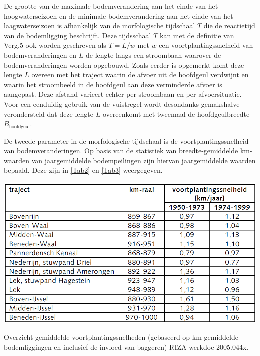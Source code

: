 De grootte van de maximale bodemverandering aan het einde van het hoogwaterseizoen en de minimale bodemverandering aan het einde van het
laagwaterseizoen is afhankelijk van de morfologische tijdschaal $T$  die de reactietijd van de bodemligging beschrijft.
Deze tijdsschaal $T$ kan met de definitie van Verg.5 ook worden geschreven als $T=L/w$ met $w$ een voortplantingssnelheid van bodemveranderingen en $L$ de lengte langs een stroombaan waarover de bodemveranderingen worden opgebouwd.
Zoals eerder is opgemerkt komt deze lengte $L$ overeen met het traject waarin de afvoer uit de hoofdgeul verdwijnt en waarin het
stroombeeld in de hoofdgeul aan deze verminderde afvoer is aangepast.
Deze afstand varieert echter per stroombaan en per afvoersituatie.
Voor een eenduidig gebruik van de vuistregel wordt desondanks gemakshalve verondersteld dat deze lengte $L$ overeenkomt met tweemaal de hoofdgeulbreedte $B_\text{hoofdgeul}$.

De tweede parameter in de morfologische tijdschaal is de voortplantingssnelheid van bodemveranderingen.
Op basis van de statistiek van breedte-gemiddelde km-waarden van jaargemiddelde bodempeilingen \citep{RIZA2005} zijn hiervan jaargemiddelde waarden bepaald.
Deze zijn in \autoref{Tab2} en \autoref{Tab3} weergegeven.

\begin{table}
\includegraphics[width=\columnwidth]{figures/Tab2.png}
\caption{Overzicht gemiddelde voortplantingssnelheden (gebaseerd op km-gemiddelde bodemliggingen en inclusief de invloed van baggeren) RIZA werkdoc 2005.044x.}
\label{Tab2Again}
\end{table}

